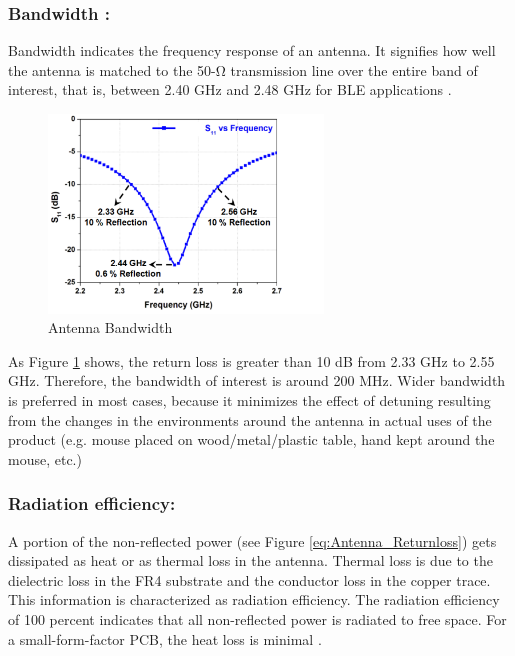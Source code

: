 \subsubsection{Bandwidth :}

Bandwidth indicates the frequency response of an antenna. It signifies how well the antenna is matched to the 50-Ω transmission line over the entire band of interest, that is, between 2.40 GHz and 2.48 GHz for BLE applications \cite{AN91445}.\\

	\begin{figure}[h]
		\centering
		\includegraphics[width=0.65\textwidth]{Chap03/Figures/Antenna_Bandwidth.PNG}
		\caption{Antenna Bandwidth}
		\label{fig:ANTENNA_BANDWIDTH}
	\end{figure}

As Figure \ref{fig:ANTENNA_BANDWIDTH} shows, the return loss is greater than 10 dB from 2.33 GHz to 2.55 GHz. Therefore, the bandwidth of 
interest is around 200 MHz. Wider bandwidth is preferred in most cases, because it minimizes the effect of detuning 
resulting from the changes in the environments around the antenna in actual uses of the product (e.g. mouse placed 
on wood/metal/plastic table, hand kept around the mouse, etc.) \cite{AN91445}

\subsubsection{Radiation efficiency: }

A portion of the non-reflected power (see Figure \ref{eq:Antenna_Returnloss}) gets dissipated as heat or as thermal 
loss in the antenna. Thermal loss is due to the dielectric loss in the FR4 substrate and the conductor loss in the 
copper trace. This information is characterized as radiation efficiency. The radiation efficiency of 100 percent indicates 
that all non-reflected power is radiated to free space. For a small-form-factor PCB, the heat loss is minimal \cite{AN91445}.

